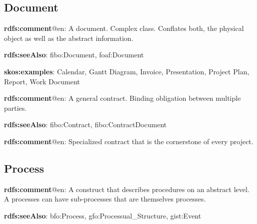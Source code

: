 \documentclass[a4paper, DIV=13, BCOR=0cm]{scrbook}
\begin{document}
\subsection{Document}
\begin{mdframed}[style=onto, frametitle={Document}]
	{%
		\begin{compactitem}
			\item \textbf{rdfs:comment}@en: A document. Complex class. Conflates both, the physical object as well as the abstract information.
			\item \textbf{rdfs:seeAlso}: fibo:Document, foaf:Document
			\item \textbf{skos:examples}: Calendar, Gantt Diagram, Invoice, Presentation, Project Plan, Report, Work Document
		\end{compactitem}
	} %
\end{mdframed}

\begin{mdframed}[style=onto-1, frametitle={Contract}]
	{%
		\begin{compactitem}
			\item \textbf{rdfs:comment}@en: A general contract. Binding obligation between multiple parties.
			\item \textbf{rdfs:seeAlso}: fibo:Contract, fibo:ContractDocument
		\end{compactitem}
	} %
\end{mdframed}

\begin{mdframed}[style=onto-2, frametitle={Project Contract}]
	{%
		\begin{compactitem}
			\item \textbf{rdfs:comment}@en: Specialized contract that is the cornerstone of every project.
		\end{compactitem}
	} %
\end{mdframed}

\subsection{Process}
\begin{mdframed}[style=onto, frametitle={Process}]
	{%
		\begin{compactitem}
			\item \textbf{rdfs:comment}@en: A construct that describes procedures on an abstract level. A processes can have sub-processes that are themselves processes.
			\item \textbf{rdfs:seeAlso}: bfo:Process, gfo:Processual\_Structure, gist:Event
		\end{compactitem}
	} %
\end{mdframed}
\end{document}
